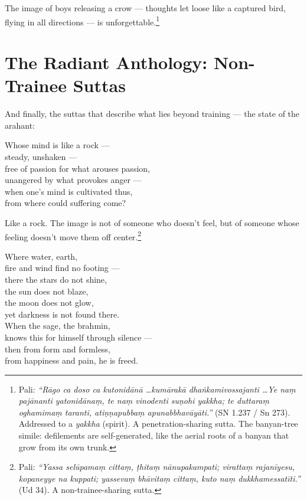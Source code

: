 \noindent The image of boys releasing a crow --- thoughts let loose like a captured bird, flying in all directions --- is unforgettable.\footnote{Pali: \textit{``Rāgo ca doso ca kutonidānā \ldots kumārakā dhaṅkamivossajanti \ldots Ye naṃ pajānanti yatonidānaṃ, te naṃ vinodenti suṇohi yakkha; te duttaraṃ oghamimaṃ taranti, atiṇṇapubbaṃ apunabbhavāyāti.''} (SN 1.237 / Sn 273). Addressed to a \textit{yakkha} (spirit). A penetration-sharing sutta. The banyan-tree simile: defilements are self-generated, like the aerial roots of a banyan that grow from its own trunk.}

\section*{The Radiant Anthology: Non-Trainee Suttas}

And finally, the suttas that describe what lies beyond training --- the state of the arahant:

\begin{versebox}
Whose mind is like a rock ---\\
steady, unshaken ---\\
free of passion for what arouses passion,\\
unangered by what provokes anger ---\\
when one's mind is cultivated thus,\\
from where could suffering come?
\end{versebox}

\noindent Like a rock. The image is not of someone who doesn't feel, but of someone whose feeling doesn't move them off center.\footnote{Pali: \textit{``Yassa selūpamaṃ cittaṃ, ṭhitaṃ nānupakampati; virattaṃ rajanīyesu, kopaneyye na kuppati; yassevaṃ bhāvitaṃ cittaṃ, kuto naṃ dukkhamessatīti.''} (Ud 34). A non-trainee-sharing sutta.}

\begin{versebox}
Where water, earth,\\
fire and wind find no footing ---\\
there the stars do not shine,\\
the sun does not blaze,\\
the moon does not glow,\\
yet darkness is not found there.\\[6pt]
When the sage, the brahmin,\\
knows this for himself through silence ---\\
then from form and formless,\\
from happiness and pain, he is freed.
\end{versebox}

